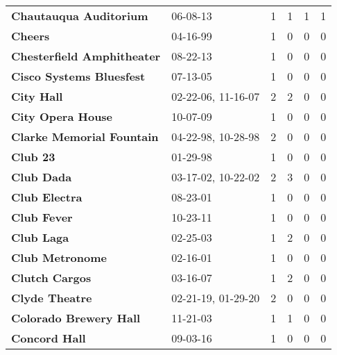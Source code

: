 \begin{supertabular}{p{0.4\textwidth}p{0.3\textwidth}p{0.05\textwidth}p{0.05\textwidth}p{0.05\textwidth}p{0.05\textwidth}}
                                       \textbf{Chautauqua Auditorium} &            06-08-13 &  1 &  1 &  1 &  1 \\
                                                      \textbf{Cheers} &            04-16-99 &  1 &  0 &  0 &  0 \\
                                   \textbf{Chesterfield Amphitheater} &            08-22-13 &  1 &  0 &  0 &  0 \\
                                     \textbf{Cisco Systems Bluesfest} &            07-13-05 &  1 &  0 &  0 &  0 \\
                                                   \textbf{City Hall} &  02-22-06, 11-16-07 &  2 &  2 &  0 &  0 \\
                                            \textbf{City Opera House} &            10-07-09 &  1 &  0 &  0 &  0 \\
                                    \textbf{Clarke Memorial Fountain} &  04-22-98, 10-28-98 &  2 &  0 &  0 &  0 \\
                                                     \textbf{Club 23} &            01-29-98 &  1 &  0 &  0 &  0 \\
                                                   \textbf{Club Dada} &  03-17-02, 10-22-02 &  2 &  3 &  0 &  0 \\
                                                \textbf{Club Electra} &            08-23-01 &  1 &  0 &  0 &  0 \\
                                                  \textbf{Club Fever} &            10-23-11 &  1 &  0 &  0 &  0 \\
                                                   \textbf{Club Laga} &            02-25-03 &  1 &  2 &  0 &  0 \\
                                              \textbf{Club Metronome} &            02-16-01 &  1 &  0 &  0 &  0 \\
                                               \textbf{Clutch Cargos} &            03-16-07 &  1 &  2 &  0 &  0 \\
                                               \textbf{Clyde Theatre} &  02-21-19, 01-29-20 &  2 &  0 &  0 &  0 \\
                                       \textbf{Colorado Brewery Hall} &            11-21-03 &  1 &  1 &  0 &  0 \\
                                                \textbf{Concord Hall} &            09-03-16 &  1 &  0 &  0 &  0 \\

\end{supertabular}
